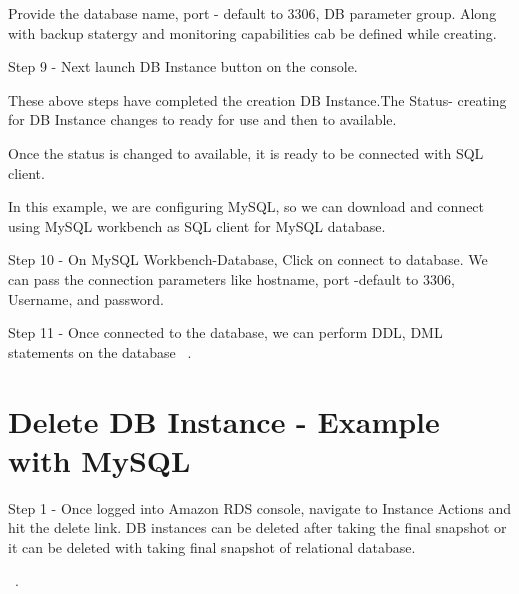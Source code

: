 Provide the database name, port - default to 3306, DB parameter group. 
Along with backup statergy and monitoring capabilities cab be defined 
while creating.

Step 9 - Next launch DB Instance button on the console.

These above steps have completed the creation DB Instance.The Status- 
creating for DB Instance changes to ready for use and then to available.

Once the status is changed to available, it is ready to be connected 
with SQL client.

In this example, we are configuring MySQL, so we can download and connect 
using MySQL workbench as SQL client for MySQL database. 

Step 10 - On MySQL Workbench-Database, Click on connect to database. We 
can pass the connection parameters like hostname, port -default to 3306, 
Username, and password.

Step 11 - Once connected to the database, we can perform DDL, DML 
statements on the database
~\cite{hid-sp18-520-amazonrdscreatesteps}.

\section{Delete DB Instance - Example with MySQL}

Step 1 - Once logged into Amazon RDS console, navigate to Instance Actions 
and hit the delete link.
DB instances can be deleted after taking the final snapshot or it can be 
deleted with taking final snapshot of relational database.

~\cite{hid-sp18-520-amazonrdscreatesteps}.



 

